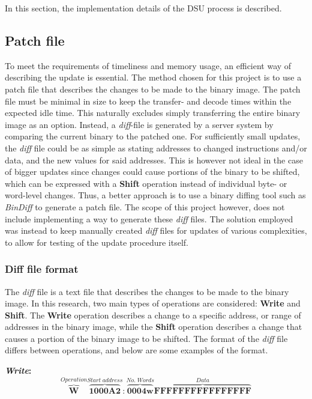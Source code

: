 In this section, the implementation details of the DSU process is described. 
\subsection{Patch file}\label{sec:patchfile}
To meet the requirements of timeliness and memory usage, an efficient way of describing the update is essential. The method chosen for this project is to use a patch file that describes the changes to be made to the binary image.
The patch file must be minimal in size to keep the transfer- and decode times within the expected idle time. This naturally excludes simply transferring the entire binary image as an option. Instead, a \textit{\textit{diff}}-file is generated by a server system by comparing the current binary to the patched one. For sufficiently small updates, the \textit{diff} file could be as simple as stating addresses to changed instructions and/or data, and the new values for said addresses. This is however not ideal in the case of bigger updates since changes could cause portions of the binary to be shifted, which can be expressed with a \textbf{Shift} operation instead of individual byte- or word-level changes. Thus, a better approach is to use a binary diffing tool such as \textit{BinDiff} to generate a patch file. The scope of this project however, does not include implementing a way to generate these \textit{diff} files. The solution employed was instead to keep manually created \textit{diff} files for updates of various complexities, to allow for testing of the update procedure itself. 

\subsubsection*{Diff file format}
The \textit{diff} file is a text file that describes the changes to be made to the binary image. In this research, two main types of operations are considered: \textbf{Write} and \textbf{Shift}. The \textbf{Write} operation describes a change to a specific address, or range of addresses in the binary image, while the \textbf{Shift} operation describes a change that causes a portion of the binary image to be shifted. The format of the \textit{diff} file differs between operations, and below are some examples of the format.

\textbf{\textit{Write}:}
\begin{equation*}
    \overbrace{\textbf{W}}^{Operation}
    \overbrace{\textbf{1000A2}}^{Start\;address}    :
    \overbrace{\textbf{0004w}}^{No.\;Words}
    \overbrace{\textbf{FFFFFFFFFFFFFFFF}}^{Data}
\end{equation*}

